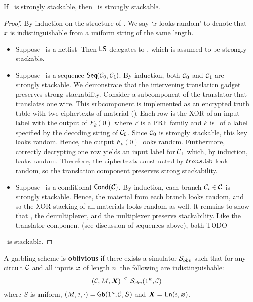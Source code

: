 \begin{theorem}\label{thm:strongstack}
  If \underscheme\ is strongly stackable, then \ourscheme\ is strongly stackable.
\end{theorem}
\begin{proof}
  By induction on the structure of \cir.
  We say `$x$ looks random' to denote that $x$ is indistinguishable from a uniform string of the same length.
  \begin{itemize}
    \item Suppose \cir\ is a netlist.
      Then $\textsf{LS}$ delegates to \underscheme,
      which is assumed to be strongly stackable.
    \item Suppose \cir\ is a sequence $\textsf{Seq}(\mathcal C_0, \mathcal C_1)$.
      By induction,
      both $\mathcal C_0$ and $\mathcal C_1$ are strongly stackable.
      We demonstrate that the intervening translation
      gadget preserves strong stackability.
      Consider a subcomponent of the translator that translates one wire.
      This subcomponent is implemented as an encrypted truth table with two ciphertexts of material ().
      Each row is the XOR of an input label with the
      output of $F_k(0)$ where $F$ is a PRF family and $k$ is \lkey\ of a label specified by the
      decoding string of $\mathcal C_0$.
      Since $\mathcal C_0$ is strongly stackable, this key looks random.
      Hence, the output $F_k(0)$ looks random.
      Furthermore, correctly decrypting one row yields an
      input label for $\mathcal C_1$ which, by induction, looks random.
      Therefore, the ciphertexts constructed by $trans.\textsf{Gb}$
      look random, so the translation component preserves strong stackability.
    \item Suppose \cir\ is a conditional $\conditional(\vec \cir)$.
      By induction, each branch $\cir_i \in \vec \cir$ is strongly
      stackable.
      Hence, the material from each branch looks random, and so the
      XOR stacking of all materials looks random as well.
      It remains to show that \gadget, the demultiplexer, and the multiplexer
      preserve stackability.
      Like the translator component (see discussion of sequences
      above), both TODO
  \end{itemize}
  \ourscheme\ is stackable.
\end{proof}

\begin{definition}[Obliviousness]\label{def:obliviousness}
  A garbling scheme is \textbf{oblivious} if there exists a
  simulator $\mathcal{S}_{obv}$ such that for
  any circuit $\mathcal C$
  and all inputs $\cirinp$ of length $n$,
  the following are indistinguishable:
  \[
    (\cir, \mat, \gcirinp) \indist \simulator_{obv}(1^\kappa, \cir)
  \]
  where
   $S$ is uniform,
   $(M, e, \cdot) = \textsf{Gb}(1^\kappa,\mathcal C,S)$
  and $\gcirinp = \gEn(e,\cirinp)$.
\end{definition}

